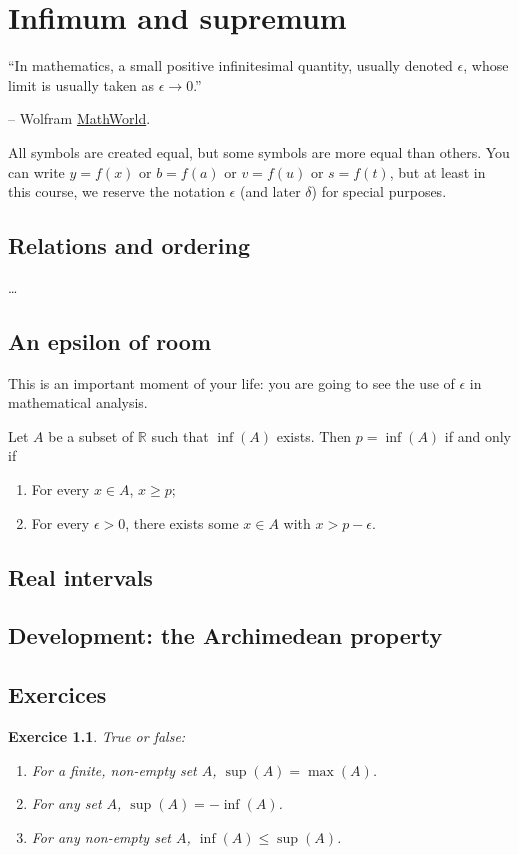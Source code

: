 \documentclass[
	fontsize=10pt, %
	twoside=true, %
	secnumdepth=1, %
	numbers=noenddot, %
]{kaobook}
\newtheorem{exer}{Exercice}[chapter]
\begin{document}
\chapter{Infimum and supremum}
``In mathematics, a small positive infinitesimal quantity, usually denoted $\epsilon$, whose limit is usually taken as $\epsilon\to 0$.''

\begin{flushright}
-- Wolfram \href{https://mathworld.wolfram.com/Epsilon.html}{MathWorld}.
\end{flushright}

All symbols are created equal, but some symbols are more equal than others. You can write $y=f(x)$ or $b=f(a)$ or $v=f(u)$ or $s=f(t)$, but at least in this course, we reserve the notation $\epsilon$ (and later $\delta$) for special purposes.

\section{Relations and ordering}
\dots

\section{An epsilon of room}
This is an important moment of your life: you are going to see the use of $\epsilon$ in mathematical analysis.

\begin{theorem}
Let $A$ be a subset of $\mathbb{R}$ such that $\inf(A)$ exists. Then $p=\inf(A)$ if and only if
\begin{enumerate}
	\item For every $x\in A$, $x\geq p$;
	\item For every $\epsilon>0$, there exists some $x\in A$ with $x>p-\epsilon$.
\end{enumerate}
\end{theorem}

\section{Real intervals}

\section{Development: the Archimedean property}

\section{Exercices}
\begin{exer}
True or false:
\begin{enumerate}
	\item For a finite, non-empty set $A$, $\sup(A)=\max(A)$.
	\item For any set $A$, $\sup(A)=-\inf(A)$.
	\item For any non-empty set $A$, $\inf(A)\leq \sup(A)$.
\end{enumerate}
\end{exer}
\end{document}
